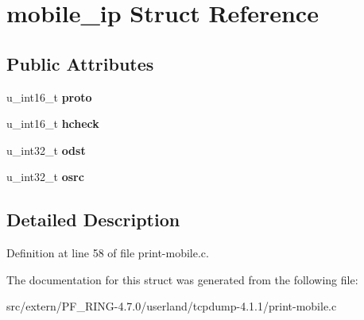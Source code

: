 \hypertarget{structmobile__ip}{
\section{mobile\_\-ip Struct Reference}
\label{structmobile__ip}
}
\subsection*{Public Attributes}
\begin{DoxyCompactItemize}
\item 
\hypertarget{structmobile__ip_a9ce9c111be9f3453b96446c45b1761d6}{
u\_\-int16\_\-t {\bfseries proto}}
\label{structmobile__ip_a9ce9c111be9f3453b96446c45b1761d6}

\item 
\hypertarget{structmobile__ip_a36bf1e3253913c942c7cf44af056360f}{
u\_\-int16\_\-t {\bfseries hcheck}}
\label{structmobile__ip_a36bf1e3253913c942c7cf44af056360f}

\item 
\hypertarget{structmobile__ip_aa7e183ba553b63cd3a2da99c82621d7f}{
u\_\-int32\_\-t {\bfseries odst}}
\label{structmobile__ip_aa7e183ba553b63cd3a2da99c82621d7f}

\item 
\hypertarget{structmobile__ip_a22daf3b48fa9117c2993827e2e258c4b}{
u\_\-int32\_\-t {\bfseries osrc}}
\label{structmobile__ip_a22daf3b48fa9117c2993827e2e258c4b}

\end{DoxyCompactItemize}


\subsection{Detailed Description}


Definition at line 58 of file print-\/mobile.c.



The documentation for this struct was generated from the following file:\begin{DoxyCompactItemize}
\item 
src/extern/PF\_\-RING-\/4.7.0/userland/tcpdump-\/4.1.1/print-\/mobile.c\end{DoxyCompactItemize}
